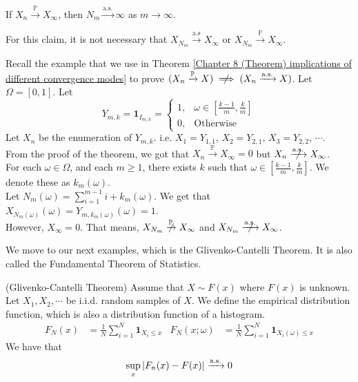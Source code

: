 \documentclass{huhtakm-template-book}
\newcommand{\prob}{\mathbb{P}}
\begin{document}
\begin{cla}
	If $X_{n}\xrightarrow{\prob}X_{\infty}$, then $N_{m}\xrightarrow{\text{a.s.}}\infty$ as $m\to\infty$.
\end{cla}
\begin{rem}
	For this claim, it is not necessary that $X_{N_{m}}\xrightarrow{\text{a.s}}X_{\infty}$ or $X_{N_{m}}\xrightarrow{\prob}X_{\infty}$.
\end{rem}
\begin{eg}
	Recall the example that we use in Theorem \ref{Chapter 8 (Theorem) implications of different convergence modes} to prove $(X_{n}\xrightarrow{\prob}X)\centernot\implies(X_{n}\xrightarrow{\text{a.s.}}X)$. Let $\Omega=[0,1]$. Let
	\begin{equation*}
		Y_{m,k}=\mathbf{1}_{I_{m,k}}=\begin{cases}
			1, &\omega\in\left[\frac{k-1}{m},\frac{k}{m}\right]\\
			0, &\text{Otherwise}
		\end{cases}
	\end{equation*}
	Let $X_{n}$ be the enumeration of $Y_{m,k}$. i.e. $X_{1}=Y_{1,1}$, $X_{2}=Y_{2,1}$, $X_{3}=Y_{2,2}$, $\cdots$.\\
	From the proof of the theorem, we got that $X_{n}\xrightarrow{\prob}X_{\infty}=0$ but $X_{n}\centernot{\xrightarrow{\text{a.s.}}}X_{\infty}$.\\
	For each $\omega\in\Omega$, and each $m\geq 1$, there exists $k$ such that $\omega\in\left[\frac{k-1}{m},\frac{k}{m}\right]$. We denote these as $k_{m}(\omega)$.\\
	Let $N_{m}(\omega)=\sum_{i=1}^{m-1}i+k_{m}(\omega)$. We get that $X_{N_{m}(\omega)}(\omega)=Y_{m,k_{m}(\omega)}(\omega)=1$.\\
	However, $X_{\infty}=0$. That means, $X_{N_{m}}\centernot{\xrightarrow{\prob}}X_{\infty}$ and $X_{N_{m}}\centernot{\xrightarrow{\text{a.s.}}}X_{\infty}$.
\end{eg}
We move to our next examples, which is the Glivenko-Cantelli Theorem. It is also called the Fundamental Theorem of Statistics.
\begin{thm}(Glivenko-Cantelli Theorem)
	Assume that $X\sim F(x)$ where $F(x)$ is unknown. Let $X_{1},X_{2},\cdots$ be i.i.d. random samples of $X$. We define the empirical distribution function, which is also a distribution function of a histogram.
	\begin{align*}
		F_{N}(x)&=\frac{1}{N}\sum_{i=1}^{N}\mathbf{1}_{X_{i}\leq x} & F_{N}(x;\omega)&=\frac{1}{N}\sum_{i=1}^{N}\mathbf{1}_{X_{i}(\omega)\leq x}
	\end{align*}
	We have that
	\begin{equation*}
		\sup_{x}\left|{F_{n}(x)-F(x)}\right|\xrightarrow{\text{a.s.}}0
	\end{equation*}
\end{thm}
\end{document}
